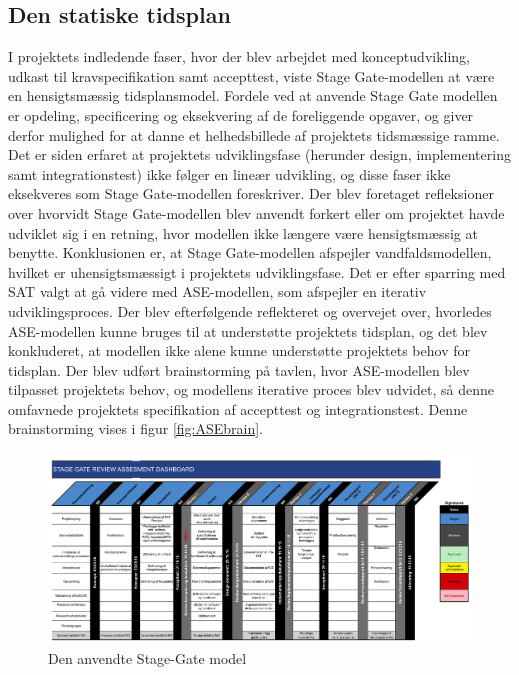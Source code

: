 \subsection{Den statiske tidsplan}

	I projektets indledende faser, hvor der blev arbejdet med konceptudvikling, udkast til kravspecifikation samt accepttest, viste Stage Gate-modellen at være en hensigtsmæssig tidsplansmodel. Fordele ved at anvende Stage Gate modellen er opdeling, specificering og eksekvering af de foreliggende opgaver, og giver derfor mulighed for at danne et helhedsbillede af projektets tidsmæssige ramme. Det er siden erfaret at projektets udviklingsfase (herunder design, implementering samt integrationstest) ikke følger en lineær udvikling, og disse faser ikke eksekveres som Stage Gate-modellen foreskriver. Der blev foretaget refleksioner over hvorvidt Stage Gate-modellen blev anvendt forkert eller om projektet havde udviklet sig i en retning, hvor modellen ikke længere være hensigtsmæssig at benytte. Konklusionen er, at Stage Gate-modellen afspejler vandfaldsmodellen, hvilket er uhensigtsmæssigt i projektets udviklingsfase. Det er efter sparring med SAT valgt at gå videre med ASE-modellen, som afspejler en iterativ udviklingsproces. Der blev efterfølgende reflekteret og overvejet over, hvorledes ASE-modellen kunne bruges til at understøtte projektets tidsplan, og det blev konkluderet, at modellen ikke alene kunne understøtte projektets behov for tidsplan. Der blev udført brainstorming på tavlen, hvor ASE-modellen blev tilpasset projektets behov, og modellens iterative proces blev udvidet, så denne omfavnede projektets specifikation af accepttest og integrationstest. Denne brainstorming vises i figur \ref{fig:ASEbrain}.  

\newpage
\begin{landscape}
\begin{figure}[htb]
\centering	
\includegraphics[width=9.5in]{stagegate.png}
\caption{Den anvendte Stage-Gate model}
\label{fig:stagegate}
\end{figure}
\end{landscape}

